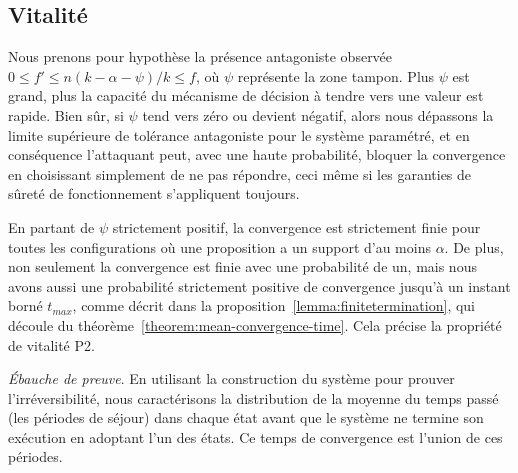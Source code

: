 \documentclass[letterpaper,twocolumn,10pt]{article}
\theoremstyle{definition}
\begin{document}

\subsection{Vitalité}

Nous prenons pour hypothèse la présence antagoniste observée $0 \leq f' \leq n(k - \alpha - \psi)/k \leq f$, où $\psi$
représente la zone tampon.
Plus $\psi$ est grand, plus la capacité du mécanisme de décision à tendre vers une valeur est rapide. Bien sûr, si $\psi$
tend vers zéro ou devient négatif, alors nous dépassons la limite supérieure de tolérance antagoniste pour le système
paramétré, et en conséquence l'attaquant peut, avec une haute probabilité, bloquer la convergence en choisissant simplement
de ne pas répondre, ceci même si les garanties de sûreté de fonctionnement s'appliquent toujours.

En partant de $\psi$ strictement positif, la convergence est strictement finie pour toutes les configurations où une
proposition a un support d'au moins $\alpha$. De plus, non seulement la convergence est finie avec une probabilité de
un, mais nous avons aussi une probabilité strictement positive de convergence jusqu'à un instant borné $t_{max}$, comme
décrit dans la proposition~\ref{lemma:finitetermination}, qui découle du théorème~\ref{theorem:mean-convergence-time}.
Cela précise la propriété de vitalité P2.

\noindent \emph{Ébauche de preuve}. En utilisant la construction du système pour prouver l'irréversibilité, nous
caractérisons la distribution de la moyenne du temps passé (les périodes de séjour) dans chaque état avant que le   %
système ne termine son exécution en adoptant l'un des états. Ce temps de convergence est l'union de ces périodes.
\end{document}
